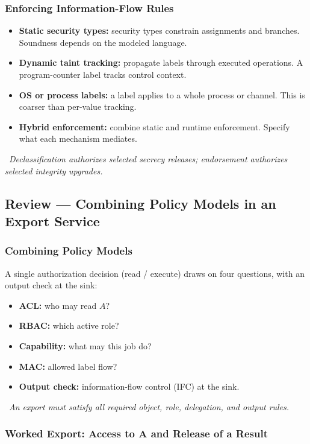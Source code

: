 \documentclass[hidelinks]{article}
\newcommand{\callout}[1]{\par\smallskip\noindent{\color{capri}$\blacktriangleright$}\ \textit{#1}\par\smallskip}
\begin{document}
\subsubsection{Enforcing Information-Flow Rules}

\begin{itemize}
    \item \textbf{Static security types:} security types constrain assignments and branches. Soundness depends on the modeled language.
    \item \textbf{Dynamic taint tracking:} propagate labels through executed operations. A program-counter label tracks control context.
    \item \textbf{OS or process labels:} a label applies to a whole process or channel. This is coarser than per-value tracking.
    \item \textbf{Hybrid enforcement:} combine static and runtime enforcement. Specify what each mechanism mediates.
\end{itemize}

\callout{Declassification authorizes selected secrecy releases; endorsement authorizes selected integrity upgrades.}

\subsection{Review --- Combining Policy Models in an Export Service}

\subsubsection{Combining Policy Models}

A single authorization decision (read / execute) draws on four questions, with an output check at the sink:
\begin{itemize}
    \item \textbf{ACL:} who may read $A$?
    \item \textbf{RBAC:} which active role?
    \item \textbf{Capability:} what may this job do?
    \item \textbf{MAC:} allowed label flow?
    \item \textbf{Output check:} information-flow control (IFC) at the sink.
\end{itemize}

\callout{An export must satisfy all required object, role, delegation, and output rules.}

\subsubsection{Worked Export: Access to A and Release of a Result}
\end{document}
